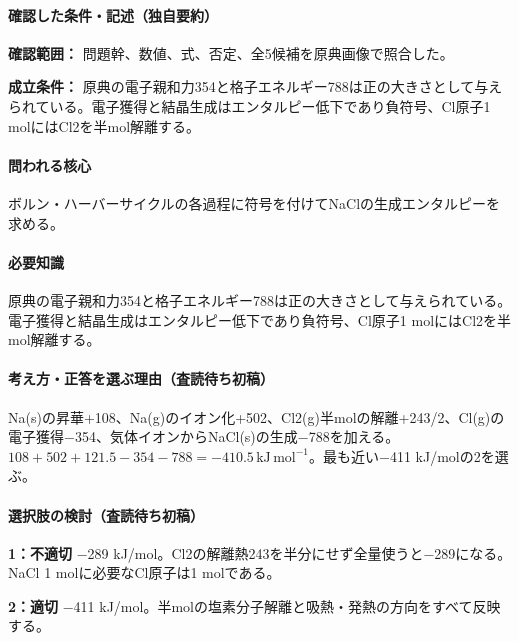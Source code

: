 \paragraph{確認した条件・記述（独自要約）}\mbox{}\par

\noindent\textbf{確認範囲：} 問題幹、数値、式、否定、全5候補を原典画像で照合した。\par

\noindent\textbf{成立条件：} 原典の電子親和力354と格子エネルギー788は正の大きさとして与えられている。電子獲得と結晶生成はエンタルピー低下であり負符号、Cl原子1 molにはCl2を半mol解離する。\par

\paragraph{問われる核心} ボルン・ハーバーサイクルの各過程に符号を付けてNaClの生成エンタルピーを求める。

\paragraph{必要知識} 原典の電子親和力354と格子エネルギー788は正の大きさとして与えられている。電子獲得と結晶生成はエンタルピー低下であり負符号、Cl原子1 molにはCl2を半mol解離する。

\paragraph{考え方・正答を選ぶ理由（査読待ち初稿）} Na(s)の昇華+108、Na(g)のイオン化+502、Cl2(g)半molの解離+243/2、Cl(g)の電子獲得−354、気体イオンからNaCl(s)の生成−788を加える。\(108+502+121.5-354-788=-410.5\,\mathrm{kJ\,mol^{-1}}\)。最も近い−411 kJ/molの2を選ぶ。

\paragraph{選択肢の検討（査読待ち初稿）}\mbox{}\par

\noindent\textbf{1：不適切} −289 kJ/mol。Cl2の解離熱243を半分にせず全量使うと−289になる。NaCl 1 molに必要なCl原子は1 molである。\par

\noindent\textbf{2：適切} −411 kJ/mol。半molの塩素分子解離と吸熱・発熱の方向をすべて反映する。\par

